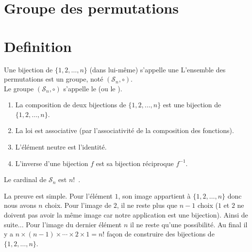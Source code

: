 \documentclass{book}
\begin{document}
\section{Groupe des permutations}
\section{Definition}
\begin{DefinitionProposition}
Une bijection de $\{1,2,\ldots,n\}$ (dans lui-même) s'appelle une 
L'ensemble des permutations  est un groupe, noté $(\mathcal{S}_n,\circ)$.\\
Le groupe $(\mathcal{S}_n,\circ)$ s'appelle le 
(ou le ).
\end{DefinitionProposition}

\begin{Demonstration}

\begin{enumerate}
  \item La composition de deux bijections de $\{1,2,\ldots,n\}$ est une bijection de $\{1,2,\ldots,n\}$.
  \item La loi est associative (par l'associativité de la composition des fonctions).
  \item L'élément neutre est l'identité.
  \item L'inverse d'une bijection $f$ est sa bijection réciproque $f^{-1}$.
\end{enumerate}
\end{Demonstration}


\begin{Lemme}
Le cardinal de $\mathcal{S}_n$ est $n!$~.
\end{Lemme}

\begin{Demonstration}
La preuve est simple. Pour l'élément $1$, son image appartient à $\{1,2,\ldots,n\}$ donc nous avons $n$ choix.
Pour l'image de $2$, il ne reste plus que $n-1$ choix ($1$ et $2$ ne doivent pas avoir la même image car
notre application est une bijection).
Ainsi de suite... Pour l'image du dernier élément $n$ il ne reste qu'une possibilité.
Au final
il y a $n\times(n-1)\times \cdots \times 2 \times 1 = n!$ façon de construire des bijections
de  $\{1,2,\ldots,n\}$.
\end{Demonstration}
\end{document}

